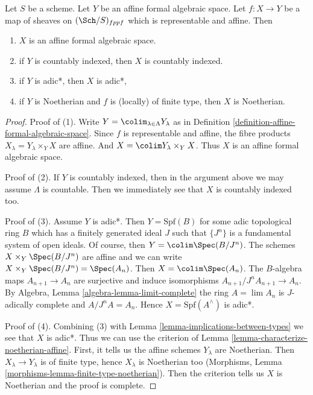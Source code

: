 \begin{lemma}
\label{lemma-property-goes-up-affine-morphism}
Let $S$ be a scheme. Let $Y$ be an affine formal algebraic space.
Let $f : X \to Y$ be a map of sheaves on $(\Sch/S)_{fppf}$ which
is representable and affine. Then
\begin{enumerate}
\item $X$ is an affine formal algebraic space.
\item if $Y$ is countably indexed, then $X$ is countably indexed.
\item if $Y$ is adic*, then $X$ is adic*,
\item if $Y$ is Noetherian and $f$ is (locally) of finite type, then
$X$ is Noetherian.
\end{enumerate}
\end{lemma}

\begin{proof}
Proof of (1). Write $Y = \colim_{\lambda \in \Lambda} Y_\lambda$ as in
Definition \ref{definition-affine-formal-algebraic-space}.
Since $f$ is representable and affine, the fibre products
$X_\lambda = Y_\lambda \times_Y X$ are affine. And
$X = \colim Y_\lambda \times_Y X$.
Thus $X$ is an affine formal algebraic space.

\medskip\noindent
Proof of (2). If $Y$ is countably indexed, then in the argument above
we may assume $\Lambda$ is countable.
Then we immediately see that $X$ is countably indexed too.

\medskip\noindent
Proof of (3). Assume $Y$ is adic*. Then $Y = \text{Spf}(B)$ for some adic
topological ring $B$ which has a finitely generated
ideal $J$ such that $\{J^n\}$ is a fundamental system of open ideals.
Of course, then $Y = \colim \Spec(B/J^n)$.
The schemes $X \times_Y \Spec(B/J^n)$ are affine
and we can write $X \times_Y \Spec(B/J^n) = \Spec(A_n)$.
Then $X = \colim \Spec(A_n)$. The $B$-algebra maps $A_{n + 1} \to A_n$
are surjective and induce isomorphisms $A_{n + 1}/J^nA_{n + 1} \to A_n$.
By Algebra, Lemma \ref{algebra-lemma-limit-complete} the ring
$A = \lim A_n$ is $J$-adically complete and $A/J^n A = A_n$.
Hence $X = \text{Spf}(A^\wedge)$ is adic*.

\medskip\noindent
Proof of (4). Combining (3) with Lemma \ref{lemma-implications-between-types}
we see that $X$ is adic*. Thus we can use the criterion of
Lemma \ref{lemma-characterize-noetherian-affine}.
First, it tells us the affine schemes $Y_\lambda$ are Noetherian.
Then $X_\lambda \to Y_\lambda$ is of finite type, hence $X_\lambda$
is Noetherian too (Morphisms, Lemma
\ref{morphisms-lemma-finite-type-noetherian}).
Then the criterion tells us $X$ is Noetherian and the proof is
complete.
\end{proof}

